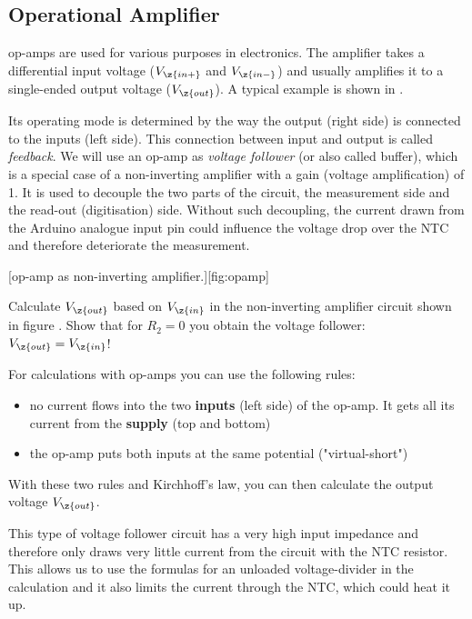 \subsection{Operational Amplifier}
\Acp{op-amp} are used for various purposes in electronics. The amplifier takes a differential input voltage ($V_{\z{in+}}$ and $V_{\z{in-}}$) and usually amplifies it to a single-ended output voltage ($V_{\z{out}}$). A typical example is shown in .\par 
%
Its operating mode is determined by the way the output (right side) is connected to the inputs (left side). This connection between input and output is called \textit{feedback}. We will use an op-amp as \textit{voltage follower} (or also called buffer), which is a special case of a non-inverting amplifier with a gain (voltage amplification) of 1. It is used to decouple the two parts of the circuit, the measurement side and the read-out (digitisation) side. Without such decoupling, the current drawn from the Arduino analogue input pin could influence the voltage drop over the \ac{NTC} and therefore deteriorate the measurement.\par
%
[\Ac{op-amp} as non-inverting amplifier.][fig:opamp]
%
\begin{task}
  Calculate $V_\z{out}$ based on $V_\z{in}$ in the non-inverting amplifier circuit shown in figure . Show that for $R_2 = 0$ you obtain the voltage follower: $V_\z{out} = V_\z{in}$!
\end{task}
%
\noindent For calculations with \acp{op-amp} you can use the following rules:
%
\begin{itemize}
  \item no current flows into the two \textbf{inputs} (left side) of the op-amp. It gets all its current from the \textbf{supply} (top and bottom)
  \item the op-amp puts both inputs at the same potential ("virtual-short")
\end{itemize}
%
\noindent With these two rules and Kirchhoff's law, you can then calculate the output voltage $V_\z{out}$.\par
%
This type of voltage follower circuit has a very high input impedance and therefore only draws very little current from the circuit with the \ac{NTC} resistor. This allows us to use the formulas for an unloaded voltage-divider in the calculation and it also limits the current through the \ac{NTC}, which could heat it up.
%
